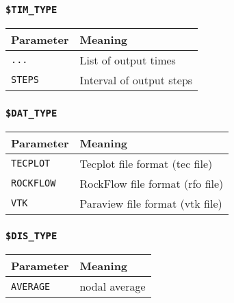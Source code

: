 \subsubsection{\texttt{\$TIM\_TYPE}}

\begin{tabular*}{12.773cm}{|p{}|p{8.9cm}|} \hline
Parameter        & Meaning \\ \hline \hline
%
\texttt{...}     & List of output times \\
\texttt{STEPS}   & Interval of output steps \\
\hline
\end{tabular*}

\subsubsection{\texttt{\$DAT\_TYPE}}

\begin{tabular*}{12.773cm}{|p{}|p{8.9cm}|} \hline
Parameter        & Meaning \\ \hline \hline
%
\texttt{TECPLOT}  & Tecplot file format (tec file) \\
\texttt{ROCKFLOW} & RockFlow file format (rfo file) \\
\texttt{VTK} & Paraview file format (vtk file) \\
\hline
\end{tabular*}

\subsubsection{\texttt{\$DIS\_TYPE}}

\begin{tabular*}{12.773cm}{|p{}|p{8.9cm}|} \hline
Parameter        & Meaning \\ \hline \hline
%
\texttt{AVERAGE} & nodal average \\
\hline
\end{tabular*}


